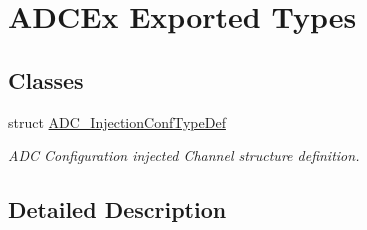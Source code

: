 \hypertarget{group___a_d_c_ex___exported___types}{\section{A\-D\-C\-Ex Exported Types}
\label{group___a_d_c_ex___exported___types}
}
\subsection*{Classes}
\begin{DoxyCompactItemize}
\item 
struct \hyperlink{struct_a_d_c___injection_conf_type_def}{A\-D\-C\-\_\-\-Injection\-Conf\-Type\-Def}
\begin{DoxyCompactList}\small\item\em A\-D\-C Configuration injected Channel structure definition. \end{DoxyCompactList}\end{DoxyCompactItemize}


\subsection{Detailed Description}
